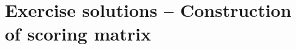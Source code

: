 \documentclass[12pt, answers]{exam}
\begin{document}
\section{Exercise solutions -- Construction of scoring matrix}

\begin{questions}






\newline

\end{questions}
 
\end{document}
